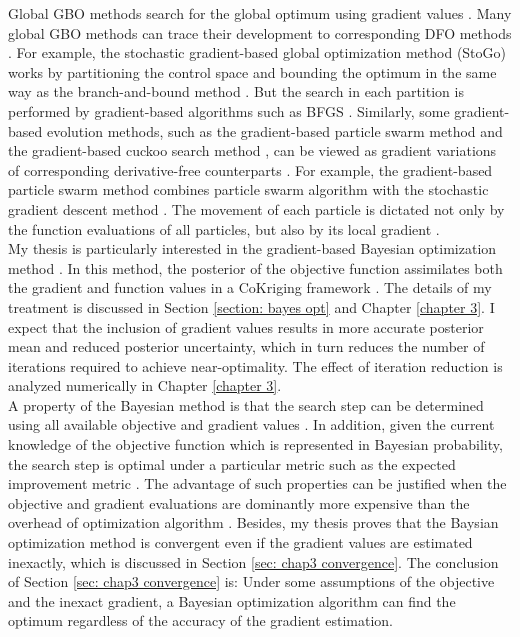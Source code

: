 Global GBO methods search for the global optimum using gradient values \cite{opt via sim review, nonlinear program}.
Many global GBO methods can trace their development to corresponding DFO methods \cite{stogo 1, stogo 2, grad particle swarm, grad cuckoo, grad coKriging}. 
For example, the stochastic gradient-based global optimization method (StoGo) 
\cite{stogo 1, stogo 2} works by partitioning the control space and bounding the optimum in the same way 
as the branch-and-bound method \cite{Branch and Bound}. But the search in each partition is performed
by gradient-based algorithms such as BFGS \cite{quasiNewton}. 
Similarly, some gradient-based evolution methods,
such as the gradient-based particle swarm method \cite{grad particle swarm} 
and the gradient-based cuckoo search method \cite{grad cuckoo},
can be viewed as gradient variations of corresponding derivative-free counterparts \cite{particle swarm, cuckoo}.
For example, the gradient-based particle swarm method combines particle swarm algorithm with the
stochastic gradient descent method \cite{grad particle swarm}. 
The movement of each particle is dictated not only by the 
function evaluations of all particles, but also by its local gradient \cite{grad particle swarm}.\\

My thesis is particularly interested in the gradient-based Bayesian optimization method \cite{coKriging}.
In this method, the posterior of the objective function assimilates both the gradient 
and function values in a CoKriging framework \cite{derivative RKHS, coKriging}.
The details of my treatment is discussed in Section \ref{section: bayes opt} and
Chapter \ref{chapter 3}.
I expect that the inclusion of gradient values results in more accurate posterior mean and 
reduced posterior uncertainty, which in turn reduces the number of iterations required to
achieve near-optimality. The effect of iteration reduction 
is analyzed numerically in Chapter \ref{chapter 3}.\\

A property of the Bayesian method is that the search step can be determined using all 
available objective and gradient values \cite{practical Bayesian, jones1998}. In addition, 
given the current knowledge of the objective function which is represented in Bayesian probability,
the search step is optimal under a particular metric such as the expected improvement metric
\cite{practical Bayesian, jones1998}. 
The advantage of such properties can be justified
when the objective and gradient evaluations
are dominantly more expensive than the overhead of 
optimization algorithm \cite{practical Bayesian}. Besides, my thesis proves that the
Baysian optimization method is convergent even if the gradient values are estimated
inexactly, which is discussed in Section \ref{sec: chap3 convergence}.
The conclusion of Section \ref{sec: chap3 convergence} is: Under some assumptions of the objective and the inexact gradient, 
a Bayesian optimization algorithm can find the optimum regardless of the accuracy of the gradient estimation.\\

